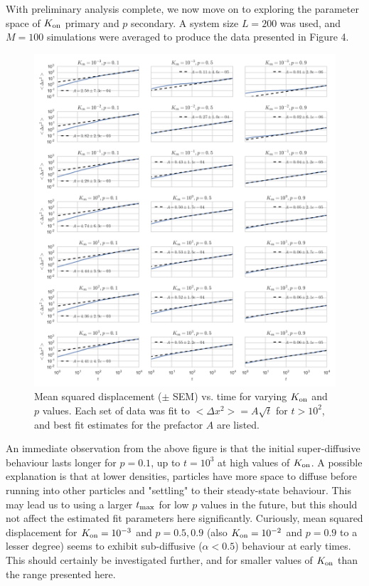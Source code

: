 \documentclass[12pt]{article}
\begin{document}
\newpage

With preliminary analysis complete, we now move on to exploring the parameter space of $K_{\rm on}$ primary and $p$ secondary.
A system size $L = 200$ was used, and $M = 100$ simulations were averaged to produce the data presented in Figure 4.
\begin{figure}[h!]
    \centering
    \includegraphics[width=\linewidth]{../plots/param_space.png}
    \caption{Mean squared displacement ($\pm$ SEM) vs. time for varying $K_{\rm on}$ and $p$ values. Each set of data was fit to $<\Delta x^2> = A \sqrt{t}$ for $t > 10^2$, and best fit estimates for the prefactor $A$ are listed.}
\end{figure}

\newpage

An immediate observation from the above figure is that the initial super-diffusive behaviour lasts longer for $p = 0.1$, up to $t = 10^3$ at high values of $K_{\rm on}$.
A possible explanation is that at lower densities, particles have more space to diffuse before running into other particles and "settling" to their steady-state behaviour.
This may lead us to using a larger $t_{\rm max}$ for low $p$ values in the future, but this should not affect the estimated fit parameters here significantly.
Curiously, mean squared displacement for $K_{\rm on} = 10^{-3}$ and $p = 0.5, 0.9$ (also $K_{\rm on} = 10^{-2}$ and $p = 0.9$ to a lesser degree) seems to exhibit sub-diffusive ($\alpha < 0.5$) behaviour at early times.
This should certainly be investigated further, and for smaller values of $K_{\rm on}$ than the range presented here.
\end{document}

